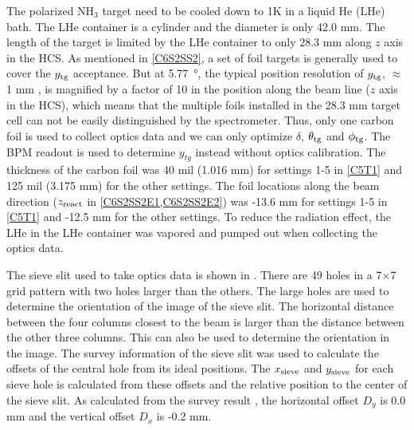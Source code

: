The polarized NH${}_3$ target need to be cooled down to 1K in a liquid He (LHe) bath. The LHe container is a cylinder and the diameter is only 42.0 mm. The length of the target is limited by the LHe container to only 28.3 mm along $z$ axis in the HCS. As mentioned in \cref{C6S2SS2}, a set of foil targets is generally used to cover the $y_{\mathrm{tg}}$ acceptance. But at \SI{5.77}{\degree}, the typical position resolution of $y_{\mathrm{tg}}$, $\approx$1 mm \cite{Alcorn2004}, is magnified by a factor of 10 in the position along the beam line ($z$ axis in the HCS), which means that the multiple foils installed in the 28.3 mm target cell can not be easily distinguished by the spectrometer. Thus, only one carbon foil is used to collect optics data and we can only optimize $\delta$, $\theta_{\mathrm{tg}}$ and $\phi_{\mathrm{tg}}$. The BPM readout is used to determine $y_{tg}$ instead without optics calibration. The thickness of the carbon foil was 40 mil (1.016 mm) for settings 1-5 in \cref{C5T1} and 125 mil (3.175 mm) for the other settings. The foil locations along the beam direction ($z_{\mathrm{react}}$ in \cref{C6S2SS2E1,C6S2SS2E2}) was -13.6 mm for settings 1-5 in \cref{C5T1} and -12.5 mm for the other settings. To reduce the radiation effect, the LHe in the LHe container was vapored and pumped out when collecting the optics data.

The sieve slit used to take optics data is shown in . There are 49 holes in a 7$\times$7 grid pattern with two holes larger than the others. The large holes are used to determine the orientation of the image of the sieve slit. The horizontal distance between the four columns closest to the beam is larger than the distance between the other three columns. This can also be used to determine the orientation in the image. The survey information of the sieve slit was used to calculate the offsets of the central hole from its ideal positions. The $x_{\mathrm{sieve}}$ and $y_{\mathrm{sieve}}$ for each sieve hole is calculated from these offsets and the relative position to the center of the sieve slit. As calculated from the survey result \cite{SurveyA1453,SurveyA1465}, the horizontal offset $D_y$ is 0.0 mm and the vertical offset $D_x$ is -0.2 mm.

